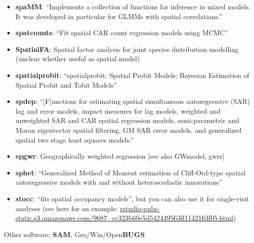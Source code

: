 \documentclass[11pt]{article}
\begin{document}
\begin{itemize}
\item \textbf{spaMM}: ``Implements a collection of functions for inference in mixed models. It was developed in particular for GLMMs with spatial correlations.''
\item \textbf{spatcounts}: ``Fit spatial CAR count regression models using MCMC''
\item \textbf{SpatialFA}: Spatial factor analysis for joint species distribution modelling (unclear whether useful as spatial model)
\item \textbf{spatialprobit}: ``spatialprobit: Spatial Probit Models; Bayesian Estimation of Spatial Probit and Tobit Models''
\item \textbf{spdep}: ``[F]unctions for estimating spatial simultaneous autoregressive (SAR) lag and error models, impact measures for lag models, weighted and unweighted SAR and CAR spatial regression models, semi-parametric and Moran eigenvector spatial filtering, GM SAR error models, and generalized spatial two stage least squares models.''
\item \textbf{spgwr}: Geographically weighted regression [see also GWmodel, gwrr]
\item \textbf{sphet}: ``Generalized Method of Moment estimation of Cliff-Ord-type spatial autoregressive models with and without heteroscedastic innovations''
\item \textbf{stocc}: ``fits spatial occupancy models'', but you can also use it for single-visit analyses (see here for an example: \url{rstudio-pubs-static.s3.amazonaws.com/9687_cc323b60e5d542449563ff1142163f05.html})
\end{itemize}
%
Other software: \textbf{SAM}, Geo/Win/Open\textbf{BUGS}
\end{document}
